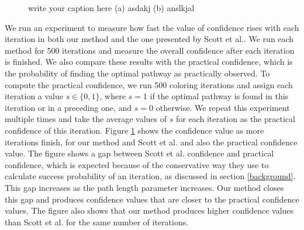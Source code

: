 \documentclass{ws-procs11x85}
\newcommand{\goodgap}{
        \hspace{\subfigtopskip}
        \hspace{\subfigbottomskip}
}
\begin{document}
\begin{figure}[h]
{}
\goodgap
{}
\caption{write your caption here (a) asdakj (b) anslkjal
}
\label{iterations}
\end{figure}



We run an experiment to measure how fast the value of confidence rises with each
iteration in both our method and the one presented by Scott et al.\cite{scott}.
We run each method for 500 iterations and measure the overall confidence after
each iteration is finished. We also compare these results with the practical
confidence, which is the probability of finding the optimal pathway as
practically observed. To compute the practical confidence, we run 500
coloring iterations and assign each iteration a value $s \in \{0, 1\}$, where
$s = 1$ if the optimal pathway is found in this iteration or in a preceding one,
and $s = 0$ otherwise. We repeat this experiment multiple times and take the
average values of $s$ for each iteration as the practical confidence of this
iteration. Figure \ref{iterations} shows the confidence value as more iterations
finish, for our method and Scott et al. and also the practical confidence value.
The figure shows a gap between Scott et al. confidence and practical confidence,
which is expected because of the conservative way they use to calculate success
probability of an iteration, as discussed in section \ref{background}. This gap
increases as the path length parameter increases. Our method closes this gap and
produces confidence values that are closer to the practical confidence values.
The figure also shows that our method produces higher confidence values than
Scott et al. for the same number of iterations.
\end{document}
